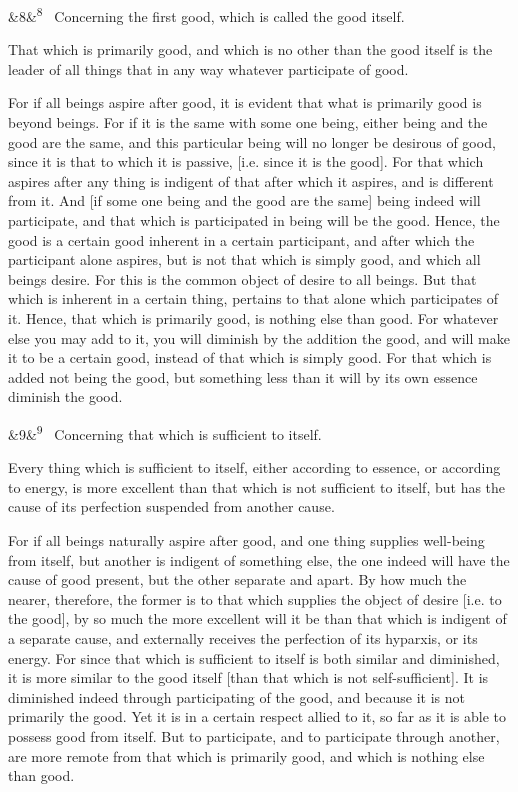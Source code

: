 \documentclass[12pt]{article}
\newcommand{\para}[1][]{\par\noindent\ifx&#1&\else\textsuperscript{\footnotesize #1}~\fi}
\begin{document}
\para[8] Concerning the first good, which is called the good itself.

That which is primarily good, and which is no other than the good itself is the leader of all things that in any way whatever participate of good.

For if all beings aspire after good, it is evident that what is primarily good is beyond beings. For if it is the same with some one being, either being and the good are the same, and this particular being will no longer be desirous of good, since it is that to which it is passive, [i.e. since it is the good]. For that which aspires after any thing is indigent of that after which it aspires, and is different from it. And [if some one being and the good are the same] being indeed will participate, and that which is participated in being will be the good. Hence, the good is a certain good inherent in a certain participant, and after which the participant alone aspires, but is not that which is simply good, and which all beings desire. For this is the common object of desire to all beings. But that which is inherent in a certain thing, pertains to that alone which participates of it. Hence, that which is primarily good, is nothing else than good. For whatever else you may add to it, you will diminish by the addition the good, and will make it to be a certain good, instead of that which is simply good. For that which is added not being the good, but something less than it will by its own essence diminish the good.

\para[9] Concerning that which is sufficient to itself.

Every thing which is sufficient to itself, either according to essence, or according to energy, is more excellent than that which is not sufficient to itself, but has the cause of its perfection suspended from another cause.

For if all beings naturally aspire after good, and one thing supplies well-being from itself, but another is indigent of something else, the one indeed will have the cause of good present, but the other separate and apart. By how much the nearer, therefore, the former is to that which supplies the object of desire [i.e. to the good], by so much the more excellent will it be than that which is indigent of a separate cause, and externally receives the perfection of its hyparxis, or its energy. For since that which is sufficient to itself is both similar and diminished, it is more similar to the good itself [than that which is not self-sufficient]. It is diminished indeed through participating of the good, and because it is not primarily the good. Yet it is in a certain respect allied to it, so far as it is able to possess good from itself. But to participate, and to participate through another, are more remote from that which is primarily good, and which is nothing else than good.
\end{document}
